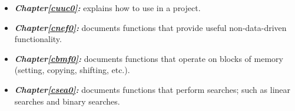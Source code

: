 \begin{itemize}
\item \emph{\textbf{Chapter\postchapterwordnonstretchable{}\ref{cuuc0}: 
      \cuuczerolongtitlenoemph{}}} explains how to use 
      \emph{\productbasenameshort{}} in a project.  
\item \emph{\textbf{Chapter\postchapterwordnonstretchable{}\ref{cnef0}: 
      \cnefzerolongtitlenoemph{}}} documents functions that provide 
      useful non-data-driven functionality.  
\item \emph{\textbf{Chapter\postchapterwordnonstretchable{}\ref{cbmf0}: 
      \cbmfzerolongtitlenoemph{}}} documents functions that operate on blocks of 
      memory (setting, copying, shifting, etc.).  
\item \emph{\textbf{Chapter\postchapterwordnonstretchable{}\ref{csea0}: 
      \cseazerolongtitlenoemph{}}} documents functions that perform searches; such as 
      linear searches and binary searches.

\end{itemize}
